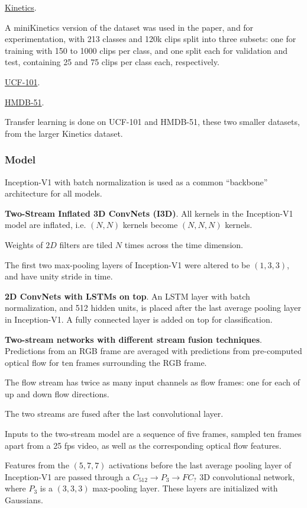 \documentclass[a4paper, 12pt]{article}
\begin{document}
\hyperref[kinetics]{Kinetics}.

A miniKinetics version of the dataset was used in the paper, and for
experimentation, with 213 classes and 120k clips split into three subsets: one
for training with 150 to 1000 clips per class, and one split each for
validation and test, containing 25 and 75 clips per class each, respectively.

\hyperref[ucf101]{UCF-101}.

\hyperref[hmdb51]{HMDB-51}.

Transfer learning is done on UCF-101 and HMDB-51, these two smaller datasets,
from the larger Kinetics dataset.

\subsubsection{Model}

Inception-V1 with batch normalization is used as a common ``backbone''
architecture for all models.

\textbf{Two-Stream Inflated 3D ConvNets (I3D)}. All kernels in the Inception-V1
model are inflated, i.e. $(N, N)$ kernels become $(N, N, N)$ kernels.

Weights of $2D$ filters are tiled $N$ times across the time dimension.

The first two max-pooling layers of Inception-V1 were altered to be
$(1, 3, 3)$, and have unity stride in time.

\textbf{2D ConvNets with LSTMs on top}. An LSTM layer with batch normalization,
and 512 hidden units, is placed after the last average pooling layer in
Inception-V1. A fully connected layer is added on top for classification.

\textbf{Two-stream networks with different stream fusion techniques}.
Predictions from an RGB frame are averaged with predictions from pre-computed
optical flow for ten frames surrounding the RGB frame.

The flow stream has twice as many input channels as flow frames: one for each
of up and down flow directions.

The two streams are fused after the last convolutional layer.

Inputs to the two-stream model are a sequence of five frames, sampled ten
frames apart from a 25 fps video, as well as the corresponding optical flow
features.

Features from the $(5, 7, 7)$ activations before the last average pooling layer
of Inception-V1 are passed through a $C_{512} \rightarrow P_3 \rightarrow FC_{?}$ 3D
convolutional network, where $P_3$ is a $(3, 3, 3)$ max-pooling layer. These
layers are initialized with Gaussians.
\end{document}
